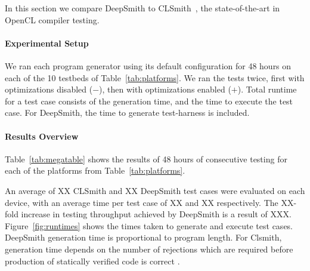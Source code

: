 In this section we compare DeepSmith to CLSmith~\cite{Lidbury2015a}, the state-of-the-art in OpenCL compiler testing.

\paragraph{Experimental Setup}

We ran each program generator using its default configuration for 48 hours on each of the 10 testbeds of Table~\ref{tab:platforms}. We ran the tests twice, first with optimizations disabled ($-$), then with optimizations enabled ($+$). Total runtime for a test case consists of the generation time, and the time to execute the test case. For DeepSmith, the time to generate test-harness is included.


\paragraph{Results Overview}

\begin{table}
  \scriptsize %
  \centering %
  
  \caption{%
    Results from 48 hours of testing using CLSmith and DeepSmith. Testbed \#. as per Table~\ref{tab:platforms}. $\pm$ denotes optimizations off ($-$) vs on ($+$). The remaining columns denote the number of build crash (\textbf{bc}), build timeout (\textbf{bto}), build failure (\textbf{bf}), runtime crash (\textbf{c}), timeout (\textbf{to}), and pass (\textbf{\cmark}) results.%
  }
  \label{tab:megatable}
\end{table}

%  

Table~\ref{tab:megatable} shows the results of 48 hours of consecutive testing for each of the platforms from Table~\ref{tab:platforms}.

An average of XX CLSmith and XX DeepSmith test cases were evaluated on each device, with an average time per test case of XX and XX respectively. The XX-fold increase in testing throughput achieved by DeepSmith is a result of XXX. Figure~\ref{fig:runtimes} shows the times taken to generate and execute test cases. DeepSmith generation time is proportional to program length. For Clsmith, generation time depends on the number of rejections which are required before production of statically verified code is correct .


